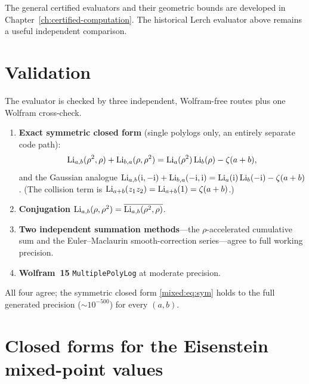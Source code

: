 The general certified evaluators and their geometric bounds are developed
in Chapter~\ref{ch:certified-computation}. The historical Lerch evaluator
above remains a useful independent comparison.

\section{Validation}\label{mixed:sec:valid}

The evaluator is checked by three independent, Wolfram-free routes plus one Wolfram cross-check.
\begin{enumerate}
\item \textbf{Exact symmetric closed form} (single polylogs only, an entirely separate code path):
  \begin{equation}\label{mixed:eq:sym}
    \operatorname{Li}_{a,b}(\rho^2,\rho)+\operatorname{Li}_{b,a}(\rho,\rho^2)=\operatorname{Li}_a(\rho^2)\operatorname{Li}_b(\rho)-\zeta(a+b),
  \end{equation}
  and the Gaussian analogue $\operatorname{Li}_{a,b}(\mathrm{i},-\mathrm{i})+\operatorname{Li}_{b,a}(-\mathrm{i},\mathrm{i})=\operatorname{Li}_a(\mathrm{i})\operatorname{Li}_b(-\mathrm{i})-\zeta(a+b)$.
  (The collision term is $\operatorname{Li}_{a+b}(z_1z_2)=\operatorname{Li}_{a+b}(1)=\zeta(a+b)$.)
\item \textbf{Conjugation} $\operatorname{Li}_{a,b}(\rho,\rho^2)=\overline{\operatorname{Li}_{a,b}(\rho^2,\rho)}$.
\item \textbf{Two independent summation methods}---the $\rho$-accelerated cumulative sum and the
  Euler--Maclaurin smooth-correction series---agree to full working precision.
\item \textbf{Wolfram~15} \texttt{MultiplePolyLog} at moderate precision.
\end{enumerate}
All four agree; the symmetric closed form \eqref{mixed:eq:sym} holds to the full generated precision
(${\sim}10^{-500}$) for every $(a,b)$.

\section{Closed forms for the Eisenstein mixed-point values}\label{mixed:sec:eisforms}

